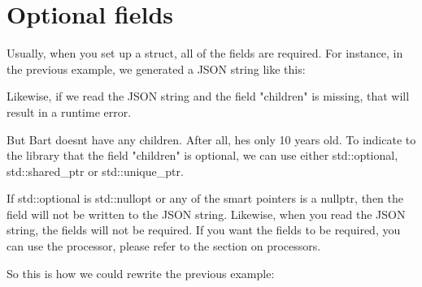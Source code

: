 \chapter{Optional fields}
\hypertarget{md_external_2reflect-cpp_2docs_2optional__fields}{}\label{md_external_2reflect-cpp_2docs_2optional__fields}
\label{md_external_2reflect-cpp_2docs_2optional__fields_autotoc_md616}%
%


Usually, when you set up a struct, all of the fields are required. For instance, in the previous example, we generated a JSON string like this\+:


\begin{DoxyCode}{0}

\end{DoxyCode}


Likewise, if we read the JSON string and the field "{}children"{} is missing, that will result in a runtime error.

But Bart doesn\textquotesingle{}t have any children. After all, he\textquotesingle{}s only 10 years old. To indicate to the library that the field "{}children"{} is optional, we can use either {\ttfamily std\+::optional}, {\ttfamily std\+::shared\+\_\+ptr} or {\ttfamily std\+::unique\+\_\+ptr}.

If {\ttfamily std\+::optional} is {\ttfamily std\+::nullopt} or any of the smart pointers is a {\ttfamily nullptr}, then the field will not be written to the JSON string. Likewise, when you read the JSON string, the fields will not be required. If you want the fields to be required, you can use the {\ttfamily {}} processor, please refer to the section on processors.

So this is how we could rewrite the previous example\+:


